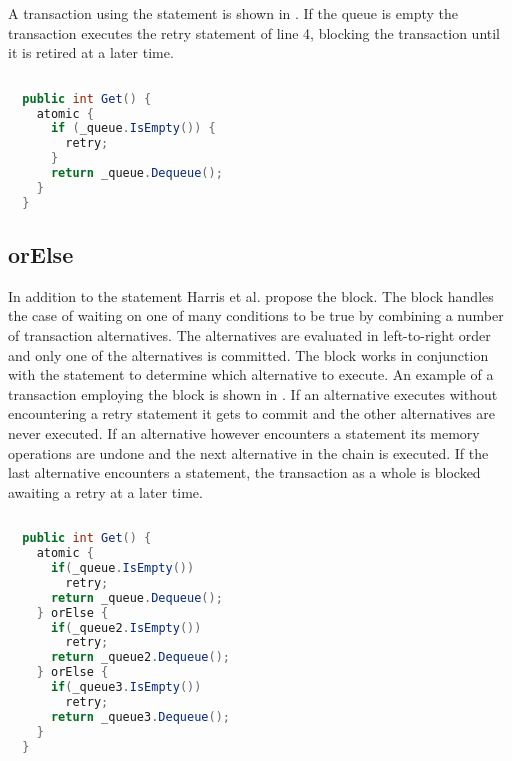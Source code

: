 A transaction using the  statement is shown in . If the queue is empty the transaction executes the retry statement of line 4, blocking the transaction until it is retired at a later time.
\begin{lstlisting}[label=lst:stm_retry,
  caption={Queue with retry},
  language=Java,  
  showspaces=false,
  showtabs=false,
  breaklines=true,
  showstringspaces=false,
  breakatwhitespace=true,
  commentstyle=\color{greencomments},
  keywordstyle=\color{bluekeywords},
  stringstyle=\color{redstrings},
  morekeywords={atomic, retry, orElse}]  % Start your code-block
  
  public int Get() {
    atomic {
      if (_queue.IsEmpty()) {
        retry;
      }
      return _queue.Dequeue();
    }
  }
\end{lstlisting}

\subsection{orElse}
In addition to the  statement Harris et al. propose the  block. The  block handles the case of waiting on one of many conditions to be true by combining a number of transaction alternatives. The alternatives are evaluated in left-to-right order and only one of the alternatives is committed\cite[p. 52]{harris2005composable}. The  block works in conjunction with the  statement to determine which alternative to execute. An example of a transaction employing the  block is shown in . If an alternative executes without encountering a retry statement it gets to commit and the other alternatives are never executed\cite[p. 74]{harris2010transactional}. If an alternative however encounters a  statement its memory operations are undone and the next alternative in the chain is executed\cite[p. 74]{harris2010transactional}. If the last alternative encounters a  statement, the transaction as a whole is blocked awaiting a retry at a later time\cite[p. 74]{harris2010transactional}.

\begin{lstlisting}[label=lst:stm_orelse,
  caption={Queue with orElse},
  language=Java,  
  showspaces=false,
  showtabs=false,
  breaklines=true,
  showstringspaces=false,
  breakatwhitespace=true,
  commentstyle=\color{greencomments},
  keywordstyle=\color{bluekeywords},
  stringstyle=\color{redstrings},
  morekeywords={atomic, retry, orElse}]  % Start your code-block
  
  public int Get() {
    atomic {
      if(_queue.IsEmpty())
        retry;
      return _queue.Dequeue();
    } orElse {
      if(_queue2.IsEmpty())
        retry;
      return _queue2.Dequeue();
    } orElse {
      if(_queue3.IsEmpty())
        retry;
      return _queue3.Dequeue();
    }
  }
\end{lstlisting}

%
\worksheetend